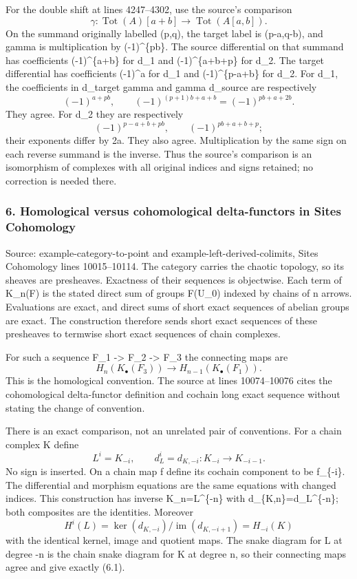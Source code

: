 For the double shift at lines 4247--4302, use the source's comparison \[
\gamma:\operatorname{Tot}(A)[a+b]
\longrightarrow \operatorname{Tot}(A[a,b]).
\] On the summand originally labelled (p,q), the target label is (p-a,q-b), and gamma is multiplication by (-1)\^{}\{pb\}. The source differential on that summand has coefficients (-1)\^{}\{a+b\} for d\_1 and (-1)\^{}\{a+b+p\} for d\_2. The target differential has coefficients (-1)\^{}a for d\_1 and (-1)\^{}\{p-a+b\} for d\_2. For d\_1, the coefficients in d\_target gamma and gamma d\_source are respectively \[
(-1)^{a+pb},\qquad
(-1)^{(p+1)b+a+b}=(-1)^{pb+a+2b}.
\] They agree. For d\_2 they are respectively \[
(-1)^{p-a+b+pb},\qquad
(-1)^{pb+a+b+p};
\] their exponents differ by 2a. They also agree. Multiplication by the same sign on each reverse summand is the inverse. Thus the source's comparison is an isomorphism of complexes with all original indices and signs retained; no correction is needed there.

\subsubsection{6. Homological versus cohomological delta-functors in Sites Cohomology}\label{homological-versus-cohomological-delta-functors-in-sites-cohomology}

Source: example-category-to-point and example-left-derived-colimits, Sites Cohomology lines 10015--10114. The category carries the chaotic topology, so its sheaves are presheaves. Exactness of their sequences is objectwise. Each term of K\_n(F) is the stated direct sum of groups F(U\_0) indexed by chains of n arrows. Evaluations are exact, and direct sums of short exact sequences of abelian groups are exact. The construction therefore sends short exact sequences of these presheaves to termwise short exact sequences of chain complexes.

For such a sequence F\_1 -\textgreater{} F\_2 -\textgreater{} F\_3 the connecting maps are \[
H_n(K_\bullet(F_3))\longrightarrow H_{n-1}(K_\bullet(F_1)).
                                                               \tag{6.1}
\] This is the homological convention. The source at lines 10074--10076 cites the cohomological delta-functor definition and cochain long exact sequence without stating the change of convention.

There is an exact comparison, not an unrelated pair of conventions. For a chain complex K define \[
L^i=K_{-i},\qquad d_L^i=d_{K,-i}:K_{-i}\longrightarrow K_{-i-1}.
\] No sign is inserted. On a chain map f define its cochain component to be f\_\{-i\}. The differential and morphism equations are the same equations with changed indices. This construction has inverse K\_n=L\^{}\{-n\} with d\_\{K,n\}=d\_L\^{}\{-n\}; both composites are the identities. Moreover \[
H^i(L)=
\ker(d_{K,-i})/\operatorname{im}(d_{K,-i+1})
=H_{-i}(K)
\] with the identical kernel, image and quotient maps. The snake diagram for L at degree -n is the chain snake diagram for K at degree n, so their connecting maps agree and give exactly (6.1).

